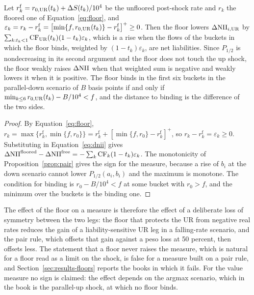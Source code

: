 \begin{proposition}
\label{prop:floor}
Let $r^{\mathrm{f}}_k=r_{0,\mathrm{UR}}(t_k)+\Delta S(t_k)/10^4$ be the unfloored post-shock rate and $r_k$ the floored one of Equation~\eqref{eq:floor}, and $\varepsilon_k=r_k-r^{\mathrm f}_k=\bigl[\min\{f,r_{0,\mathrm{UR}}(t_k)\}-r^{\mathrm f}_k\bigr]^+\ge0$. Then the floor lowers $\Delta\mathrm{NII}_{i,\mathrm{UR}}$ by $\sum_{k:t_k<1}\mathrm{CF}_{\mathrm{UR}}(t_k)(1-t_k)\varepsilon_k$, which is a rise when the flows of the buckets in which the floor binds, weighted by $(1-t_k)\varepsilon_k$, are net liabilities. Since $P_{1/2}$ is nondecreasing in its second argument and the floor does not touch the up shock, the floor weakly raises $\Delta\mathrm{NII}$ when that weighted sum is negative and weakly lowers it when it is positive. The floor binds in the first six buckets in the parallel-down scenario of $B$ basis points if and only if $\min_{k\le6}r_{0,\mathrm{UR}}(t_k)-B/10^4<f$, and the distance to binding is the difference of the two sides.
\end{proposition}
\begin{proof}
By Equation~\eqref{eq:floor}, $r_k=\max\{r^{\mathrm f}_k,\min\{f,r_{0}\}\}=r^{\mathrm f}_k+[\min\{f,r_0\}-r^{\mathrm f}_k]^+$, so $r_k-r^{\mathrm f}_k=\varepsilon_k\ge0$. Substituting in Equation~\eqref{eq:dnii} gives $\Delta\mathrm{NII}^{\mathrm{floored}}-\Delta\mathrm{NII}^{\mathrm{free}}=-\sum_k\mathrm{CF}_k(1-t_k)\varepsilon_k$. The monotonicity of Proposition~\ref{prop:pair} gives the sign for the measure, because a rise of $b_i$ at the down scenario cannot lower $P_{1/2}(a_i,b_i)$ and the maximum is monotone. The condition for binding is $r_0-B/10^4<f$ at some bucket with $r_0>f$, and the minimum over the buckets is the binding one.
\end{proof}

The effect of the floor on a measure is therefore the effect of a deliberate loss of symmetry between the two legs: the floor that protects the UR from negative real rates reduces the gain of a liability-sensitive UR leg in a falling-rate scenario, and the pair rule, which offsets that gain against a peso loss at 50 percent, then offsets less. The statement that a floor never raises the measure, which is natural for a floor read as a limit on the shock, is false for a measure built on a pair rule, and Section~\ref{sec:results-floors} reports the books in which it fails. For the value measure no sign is claimed: the effect depends on the argmax scenario, which in the book is the parallel-up shock, at which no floor binds.

